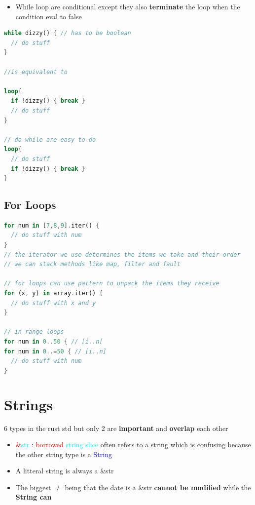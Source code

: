 \documentclass{report}
\begin{document}
\begin{multicols*}{2}
\begin{itemize}
  \item While loop are conditional except they also \textbf{terminate} the loop when the condition eval to false
\end{itemize}

\begin{tcolorbox}[title=While Loops,colback=backcolour,size=small,left=4mm]
\begin{lstlisting}[language=rust]
while dizzy() { // has to be boolean
  // do stuff
}

//is equivalent to  

loop{
  if !dizzy() { break }
  // do stuff
}

// do while are easy to do
loop{
  // do stuff
  if !dizzy() { break }
}
\end{lstlisting}
\end{tcolorbox}

\subsection{For Loops}%
\label{sub:For .. in range}

\begin{tcolorbox}[title=For Loops,colback=backcolour,size=small,left=4mm]
\begin{lstlisting}[language=rust]
for num in [7,8,9].iter() {
  // do stuff with num
}
// the iterator we use determines the items we take and their order 
// we can stack methods like map, filter and fault

// for loops can use pattern to unpack the items they receive
for (x, y) in array.iter() {
  // do stuff with x and y
}

// in range loops
for num in 0..50 { // [i..n[
for num in 0..=50 { // [i..n]
  // do stuff with num
}

\end{lstlisting}
\end{tcolorbox}

\section{Strings}

6 types in the rust std but only 2 are \textbf{important} and \textbf{overlap} each other

\begin{itemize}
  \item \textcolor{red}{\&}\textcolor{cyan}{str} : \textcolor{red}{borrowed} \textcolor{cyan}{string slice} often refers to a string
    which is confusing because the other string type is a \textcolor{blue}{String}  
  \item A litteral string is always a \&str 
  \item The biggest $\neq$ being that the date is a \&str \textbf{cannot be modified} while the \textbf{String can} 
\end{itemize}


\end{multicols*}
\end{document}
